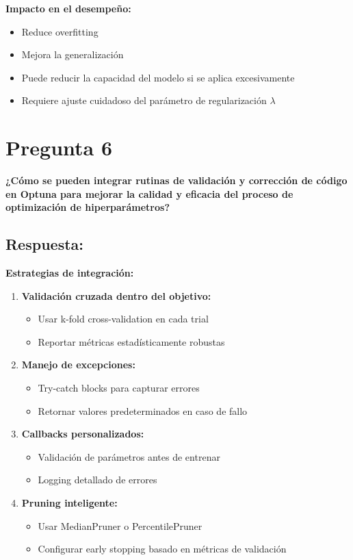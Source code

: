 \documentclass[12pt]{article}
\begin{document}
\textbf{Impacto en el desempeño:}
\begin{itemize}
    \item Reduce overfitting
    \item Mejora la generalización
    \item Puede reducir la capacidad del modelo si se aplica excesivamente
    \item Requiere ajuste cuidadoso del parámetro de regularización $\lambda$
\end{itemize}

\section*{Pregunta 6}
\textbf{¿Cómo se pueden integrar rutinas de validación y corrección de código en Optuna para mejorar la calidad y eficacia del proceso de optimización de hiperparámetros?}

\subsection*{Respuesta:}

\textbf{Estrategias de integración:}

\begin{enumerate}
    \item \textbf{Validación cruzada dentro del objetivo:}
    \begin{itemize}
        \item Usar k-fold cross-validation en cada trial
        \item Reportar métricas estadísticamente robustas
    \end{itemize}
    
    \item \textbf{Manejo de excepciones:}
    \begin{itemize}
        \item Try-catch blocks para capturar errores
        \item Retornar valores predeterminados en caso de fallo
    \end{itemize}
    
    \item \textbf{Callbacks personalizados:}
    \begin{itemize}
        \item Validación de parámetros antes de entrenar
        \item Logging detallado de errores
    \end{itemize}
    
    \item \textbf{Pruning inteligente:}
    \begin{itemize}
        \item Usar MedianPruner o PercentilePruner
        \item Configurar early stopping basado en métricas de validación
    \end{itemize}
\end{enumerate}
\end{document}
